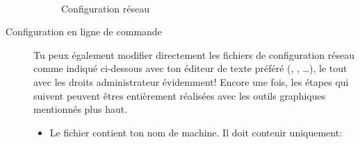 \begin{description}
\noindent
  \begin{figure}[!h]
    \begin{center}  
       \\
         	 \caption{Configuration réseau}
    \end{center}
  \end{figure}
  

\item[Configuration en ligne de commande]
 Tu peux également modifier directement les fichiers de configuration réseau comme indiqué ci-dessous avec ton éditeur de texte préféré (, , \dots), le tout avec les droits
 administrateur évidemment! Encore une fois,  les étapes qui suivent peuvent \^etres entièrement réalisées avec les outils graphiques mentionnés plus haut.

 \begin{itemize}
 \item Le fichier  contient ton nom de machine. Il doit contenir uniquement: 
  

\end{itemize}
\end{description}
